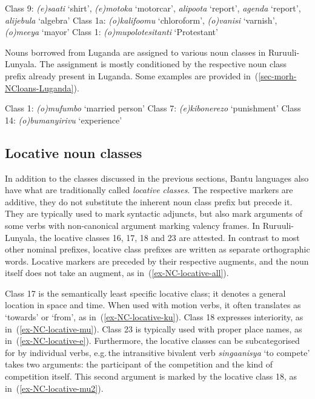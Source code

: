 \ea \label{sec-morh-NCloans-English}
\begin{xlist}	
	\ex Class 9: \textit{(e)saati} ‘shirt’, \textit{(e)motoka} ‘motorcar’, \textit{alipoota} ‘report’,  \textit{agenda} ‘report’,  \textit{alijebula} ‘algebra’ 
	\ex Class 1a: \textit{(o)kalifoomu} ‘chloroform’, \textit{(o)vanisi} `varnish',\\\textit{(o)meeya} `mayor'
	\ex Class 1: \textit{(o)mupolotesitanti} ‘Protestant’
\end{xlist}	
\z

Nouns borrowed from Luganda are assigned to various noun  classes in Ru\-ruu\-li-Lu\-nya\-la. 
The assignment is mostly conditioned by the respective noun class prefix already present in Luganda. 
Some examples are provided in~(\ref{sec-morh-NCloans-Luganda}).

\ea \label{sec-morh-NCloans-Luganda}
\begin{xlist}	
	\ex Class 1: \textit{(o)mufumbo} `married person’
	\ex Class 7: \textit{(e)kibonerezo} ‘punishment’
	\ex Class 14: \textit{(o)bumanyirivu} ‘experience’
\end{xlist}	
\z


\subsection{Locative noun classes}\label{sec-morh-locative}

In addition to the classes discussed in the previous sections, Bantu languages also have what are traditionally called \textit{locative classes}. 
The respective markers are additive, \ie they do not substitute the inherent noun class prefix but precede it. 
They are typically used to mark syntactic adjuncts, but also mark arguments of some verbs with non-canonical argument marking valency frames. 
In Ru\-ruu\-li\hyp{}Lu\-nya\-la, the locative classes 16, 17, 18 and 23 are attested.
In contrast to most other nominal prefixes, locative class prefixes are written as separate orthographic words. 
Locative markers are preceded by their respective augments, and the noun itself does not take an augment, as in~(\ref{ex-NC-locative-all}).

Class 17 is the semantically least specific locative class; it denotes a general location in space and time. 
When used with motion verbs, it often translates as `towards' or `from', as in~(\ref{ex-NC-locative-ku}).
Class 18 expresses interiority, as in~(\ref{ex-NC-locative-mu}). 
Class 23 is typically used with proper place names, as in~(\ref{ex-NC-locative-e}). 
Furthermore, the locative classes can be subcategorised for by individual verbs, e.g.\,the intransitive bivalent verb \textit{singaanisya} `to compete' takes two arguments: the participant of the competition and the kind of competition itself. 
This second argument is marked by the locative class 18, as in~(\ref{ex-NC-locative-mu2}).
	
